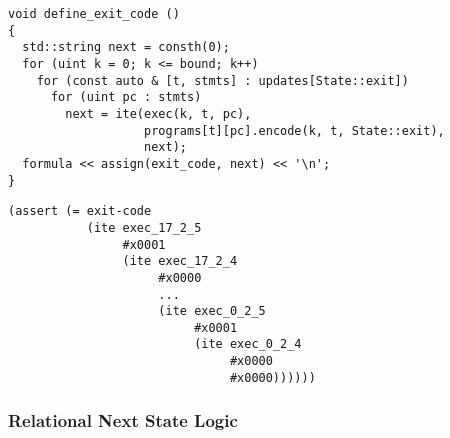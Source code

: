 \begin{lstlisting}[style=c++]
void define_exit_code ()
{
  std::string next = consth(0);
  for (uint k = 0; k <= bound; k++)
    for (const auto & [t, stmts] : updates[State::exit])
      for (uint pc : stmts)
        next = ite(exec(k, t, pc),
                   programs[t][pc].encode(k, t, State::exit),
                   next);
  formula << assign(exit_code, next) << '\n';
}
\end{lstlisting}

\begin{lstlisting}[language=SMTLib]
(assert (= exit-code
           (ite exec_17_2_5
                #x0001
                (ite exec_17_2_4
                     #x0000
                     ...
                     (ite exec_0_2_5
                          #x0001
                          (ite exec_0_2_4
                               #x0000
                               #x0000))))))
\end{lstlisting}

\newpage

\subsubsection{Relational Next State Logic}


